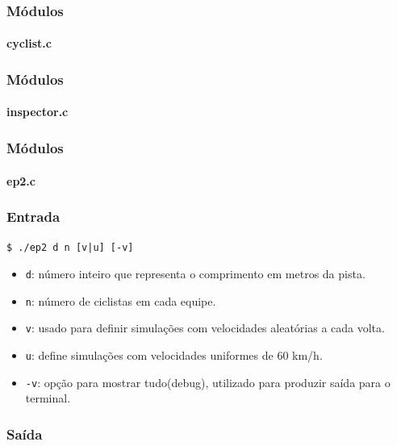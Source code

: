 \documentclass{beamer}
\begin{document}
\begin{frame}
	\frametitle{Módulos}
	\framesubtitle{cyclist.c}	
\end{frame}

\begin{frame}
	\frametitle{Módulos}
	\framesubtitle{inspector.c}	
\end{frame}

\begin{frame}
	\frametitle{Módulos}
	\framesubtitle{ep2.c}	
\end{frame}

\begin{frame}
	\frametitle{Entrada}
	\begin{center}
		\texttt{\$ ./ep2 d n [v|u] [-v]}
	\end{center}	
	\begin{itemize}
		\item \texttt{d}: número inteiro que representa o comprimento em metros da pista.
		\item \texttt{n}: número de ciclistas em cada equipe. 
		\item \texttt{v}: usado para definir simulações com velocidades aleatórias a cada volta. 
		\item \texttt{u}: define simulações com velocidades uniformes de 60 km/h.  
		\item \texttt{-v}: opção para mostrar tudo(debug), utilizado para produzir saída para o terminal. 
	\end{itemize} 
\end{frame}

\begin{frame}
	\frametitle{Saída}
	
\end{frame}
\end{document}
